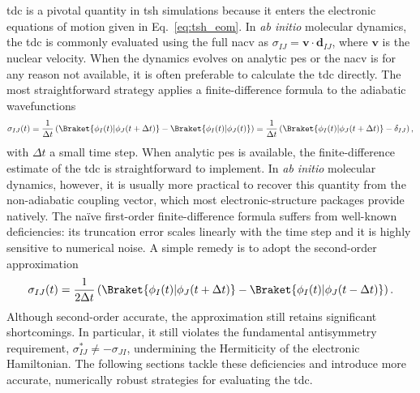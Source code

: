 \section{\filetotitle}\label{sec:time_derivative_coupling}
\acrshort{tdc} is a pivotal quantity in \acrshort{tsh} simulations because it enters the electronic equations of motion given in Eq.~\eqref{eq:tsh_eom}. In \textit{ab initio} molecular dynamics, the \acrshort{tdc} is commonly evaluated using the full \acrshort{nacv} as $\sigma_{IJ}=\symbf{v}\cdot\symbf{d}_{IJ}$, where $\symbf{v}$ is the nuclear velocity. When the dynamics evolves on analytic \acrshort{pes} or the \acrshort{nacv} is for any reason not available, it is often preferable to calculate the \acrshort{tdc} directly. The most straightforward strategy applies a finite-difference formula to the adiabatic wavefunctions
\begin{equation}\label{eq:tdc_fd1}
\sigma_{IJ}(t)=\frac{1}{\Delta t}\left(\Braket{\phi_I(t)\vert\phi_J(t+\Delta t)}-\Braket{\phi_I(t)\vert\phi_J(t)}\right)=\frac{1}{\Delta t}\left(\Braket{\phi_I(t)\vert\phi_J(t+\Delta t)}-\delta_{IJ}\right),
\end{equation}
with $\Delta t$ a small time step. When analytic \acrshort{pes} is available, the finite-difference estimate of the \acrshort{tdc} is straightforward to implement. In \textit{ab initio} molecular dynamics, however, it is usually more practical to recover this quantity from the non-adiabatic coupling vector, which most electronic-structure packages provide natively. The naïve first-order finite-difference formula suffers from well-known deficiencies: its truncation error scales linearly with the time step and it is highly sensitive to numerical noise. A simple remedy is to adopt the second-order approximation
\begin{equation}\label{eq:tdc_fd2}
\sigma_{IJ}(t)=\frac{1}{2\Delta t}\left(\Braket{\phi_I(t)\vert\phi_J(t+\Delta t)}-\Braket{\phi_I(t)\vert\phi_J(t-\Delta t)}\right).
\end{equation}
Although second-order accurate, the approximation still retains significant shortcomings. In particular, it still violates the fundamental antisymmetry requirement, $\sigma_{IJ}^\ast\neq-\sigma_{JI}$, undermining the Hermiticity of the electronic Hamiltonian. The following sections tackle these deficiencies and introduce more accurate, numerically robust strategies for evaluating the \acrshort{tdc}.
